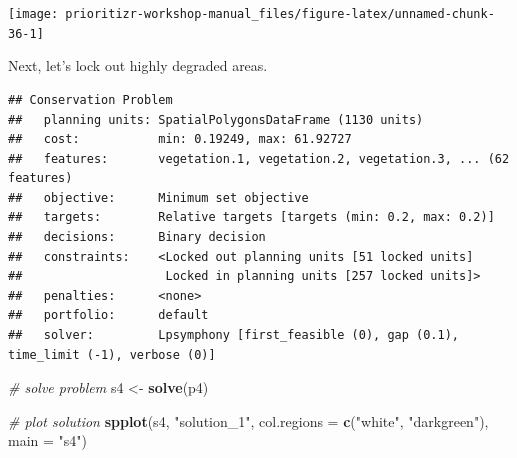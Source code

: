 \documentclass[12pt,]{book}
\newenvironment{Shaded}{\begin{snugshade}}{\end{snugshade}}
\newcommand{\KeywordTok}[1]{\textcolor[rgb]{0.13,0.29,0.53}{\textbf{#1}}}
\newcommand{\DataTypeTok}[1]{\textcolor[rgb]{0.13,0.29,0.53}{#1}}
\newcommand{\FloatTok}[1]{\textcolor[rgb]{0.00,0.00,0.81}{#1}}
\newcommand{\StringTok}[1]{\textcolor[rgb]{0.31,0.60,0.02}{#1}}
\newcommand{\CommentTok}[1]{\textcolor[rgb]{0.56,0.35,0.01}{\textit{#1}}}
\newcommand{\OtherTok}[1]{\textcolor[rgb]{0.56,0.35,0.01}{#1}}
\newcommand{\OperatorTok}[1]{\textcolor[rgb]{0.81,0.36,0.00}{\textbf{#1}}}
\newcommand{\NormalTok}[1]{#1}
\begin{document}
\begin{center}\texttt{[image: prioritizr-workshop-manual\_files/figure-latex/unnamed-chunk-36-1]} \end{center}

Next, let's lock out highly degraded areas.

\begin{Shaded}
\end{Shaded}

\begin{verbatim}
## Conservation Problem
##   planning units: SpatialPolygonsDataFrame (1130 units)
##   cost:           min: 0.19249, max: 61.92727
##   features:       vegetation.1, vegetation.2, vegetation.3, ... (62 features)
##   objective:      Minimum set objective 
##   targets:        Relative targets [targets (min: 0.2, max: 0.2)]
##   decisions:      Binary decision 
##   constraints:    <Locked out planning units [51 locked units]
##                    Locked in planning units [257 locked units]>
##   penalties:      <none>
##   portfolio:      default
##   solver:         Lpsymphony [first_feasible (0), gap (0.1), time_limit (-1), verbose (0)]
\end{verbatim}

\begin{Shaded}
\begin{Highlighting}[]
\CommentTok{# solve problem}
\NormalTok{s4 <-}\StringTok{ }\KeywordTok{solve}\NormalTok{(p4)}

\CommentTok{# plot solution}
\KeywordTok{spplot}\NormalTok{(s4, }\StringTok{"solution_1"}\NormalTok{, }\DataTypeTok{col.regions =} \KeywordTok{c}\NormalTok{(}\StringTok{"white"}\NormalTok{, }\StringTok{"darkgreen"}\NormalTok{), }\DataTypeTok{main =} \StringTok{"s4"}\NormalTok{)}
\end{Highlighting}
\end{Shaded}
\end{document}
